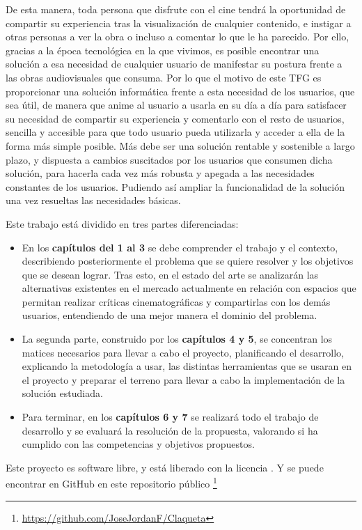 De esta manera, toda persona que disfrute con el cine tendrá la oportunidad de compartir su experiencia 
tras la visualización de cualquier contenido, e instigar a otras personas a ver la obra o incluso a 
comentar lo que le ha parecido. Por ello, gracias a la época tecnológica en la que vivimos, es posible 
encontrar una solución a esa necesidad de cualquier usuario de manifestar su postura frente a las obras 
audiovisuales que consuma. Por lo que el motivo de este TFG es proporcionar una solución informática 
frente a esta necesidad de los usuarios, que sea útil, de manera que anime al usuario a usarla en su día a 
día para satisfacer su necesidad de compartir su experiencia y comentarlo con el resto de usuarios, 
sencilla y accesible para que todo usuario pueda utilizarla y acceder a ella de la forma más simple 
posible. Más debe ser una solución rentable y sostenible a largo plazo, y dispuesta a cambios suscitados 
por los usuarios que consumen dicha solución, para hacerla cada vez más robusta y apegada a las 
necesidades constantes de los usuarios. Pudiendo así ampliar la funcionalidad de la solución una vez 
resueltas las necesidades básicas.

Este trabajo está dividido en tres partes diferenciadas:
\begin{itemize}
    \item En los \textbf{capítulos del 1 al 3} se debe comprender el trabajo y el contexto, describiendo 
    posteriormente el problema que se quiere resolver y los objetivos que se desean lograr. Tras esto, en 
    el estado del arte se analizarán las alternativas existentes en el mercado actualmente en relación con 
    espacios que permitan realizar críticas cinematográficas y compartirlas con los demás usuarios, 
    entendiendo de una mejor manera el dominio del problema.
    \item La segunda parte, construido por los \textbf{capítulos 4 y 5}, se concentran los matices 
    necesarios para llevar a cabo el proyecto, planificando el desarrollo, explicando la metodología a 
    usar, las distintas herramientas que se usaran en el proyecto y preparar el terreno para llevar a cabo 
    la implementación de la solución estudiada.
    \item Para terminar, en los \textbf{capítulos 6 y 7} se realizará todo el trabajo de desarrollo y se 
    evaluará la resolución de la propuesta, valorando si ha cumplido con las competencias y objetivos 
    propuestos.
\end{itemize}

Este proyecto es software libre, y está liberado con la licencia \cite{gplv3}. Y se puede encontrar en 
GitHub en este repositorio público \footnote{\url{https://github.com/JoseJordanF/Claqueta}}